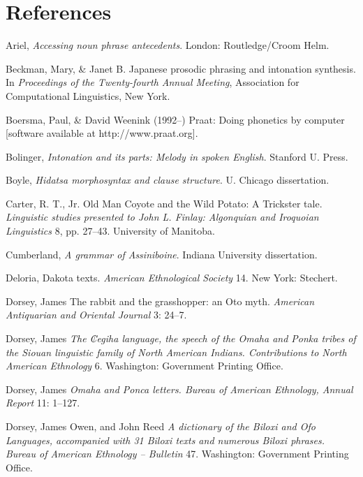 \documentclass[output=paper]{LSP/langsci}
\begin{document}
\section*{References}


\printbibliography[heading=subbibliography,notkeyword=this]

\begin{reflist}

Ariel, \citet{Mira1990} \emph{Accessing noun phrase antecedents}. London: Routledge/Croom Helm. 

Beckman, Mary, \& Janet B. \citet{Pierrehumbert1986} Japanese prosodic phrasing and intonation synthesis. In \emph{Proceedings of the Twenty-fourth Annual Meeting}, Association for Computational Linguistics, New York.

Boersma, Paul, \& David Weenink (1992--) Praat: Doing phonetics by computer [software available at http://www.praat.org].

Bolinger, \citet{Dwight1986} \emph{Intonation and its parts: Melody in spoken English}. Stanford U. Press.

Boyle, \citet{John2007} \emph{Hidatsa morphosyntax and clause structure}. U. Chicago dissertation.

Carter, R. T., Jr.  Old Man Coyote and the Wild Potato: A Trickster tale. \emph{Linguistic studies presented to John L. Finlay: Algonquian and Iroquoian Linguistics} 8, pp. 27--43. University of Manitoba.

Cumberland, \citet{Linda2005} \emph{A grammar of Assiniboine}. Indiana University dissertation.

Deloria, \citet{Ella1932} Dakota texts. \emph{American Ethnological Society} 14. New York: Stechert.

Dorsey, James \citet{Owen1880} The rabbit and the grasshopper: an Oto myth. \emph{American Antiquarian and Oriental Journal} 3: 24--7.

Dorsey, James \citet{Owen1890} \emph{The ₡egiha language, the speech of the Omaha and Ponka tribes of the Siouan linguistic family of North American Indians. Contributions to North American Ethnology} 6. Washington: Government Printing Office.

Dorsey, James \citet{Owen1891} \emph{Omaha and Ponca letters. Bureau of American Ethnology, Annual Report} 11: 1--127.

Dorsey, James Owen, and John Reed \citet{Swanton1912} \emph{A dictionary of the Biloxi and Ofo Languages, accompanied with 31 Biloxi texts and numerous Biloxi phrases. Bureau of American Ethnology -- Bulletin} 47. Washington: Government Printing Office.


\end{reflist}
\end{document}
